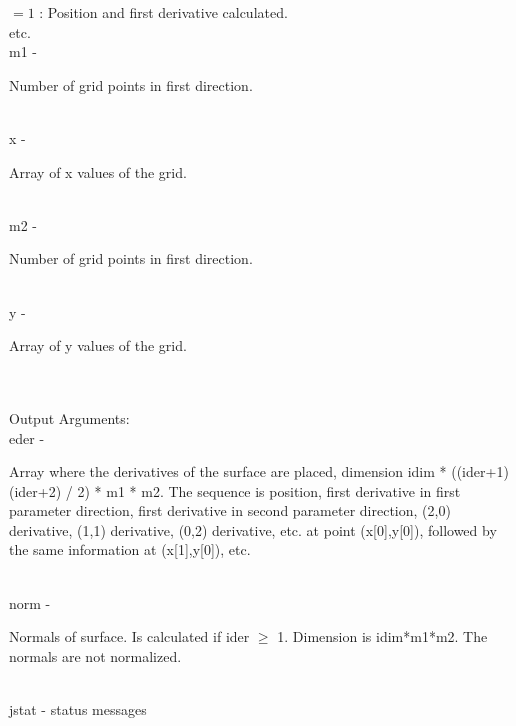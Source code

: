 		 \>\>\>\>\>      $= 1$ : Position and first derivative calculated.\\
		 \>\>\>\>\>      etc.\\	 
        \>\>    {\fov m1}\> - \>  \begin{minipg2}
                     Number of grid points in first direction.
                               \end{minipg2}\\
        \>\>    {\fov x}\> - \>  \begin{minipg2}
                     Array of x values of the grid.
                               \end{minipg2}\\
        \>\>    {\fov m2}\> - \>  \begin{minipg2}
                     Number of grid points in first direction.
                               \end{minipg2}\\
        \>\>    {\fov y}\> - \>  \begin{minipg2}
                     Array of y values of the grid.
                               \end{minipg2}\\
\\
	\>Output Arguments:\\
        \>\>    {\fov eder}\> - \>  \begin{minipg2}
                     Array where the derivatives of the surface
                       are placed, dimension
                         idim * ((ider+1)(ider+2) / 2) * m1 * m2.
                       The sequence is position,
                       first derivative in first parameter direction,
                       first derivative in second parameter direction,
                       (2,0) derivative, (1,1) derivative, (0,2)
                       derivative, etc. at point (x[0],y[0]),
                       followed by the same information at (x[1],y[0]),
                       etc.
                               \end{minipg2}\\
        \>\>    {\fov norm}\> - \>  \begin{minipg2}
                     Normals of surface. Is calculated if ider $\ge$ 1.
                       Dimension is idim*m1*m2.
                       The normals are not normalized.
                               \end{minipg2}\\
        \>\>    {\fov jstat}\> - \> status messages \\
